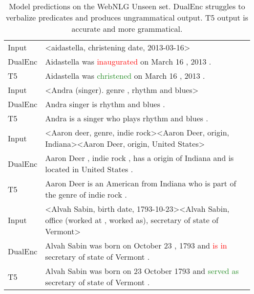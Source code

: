 \documentclass[11pt,a4paper]{article}
\begin{document}
\begin{table*}[h]
\begin{adjustbox}{width=\textwidth,center}
\begin{tabular}{|l|l|} \hline
Input & \textless{}aidastella, christening date, 2013-03-16\textgreater{}                                                                                                  \\
DualEnc & Aidastella was \textcolor{red}{inaugurated} on March 16 , 2013 .                                                                                                                    \\  
T5      & Aidastella was \textcolor{ForestGreen}{christened} on March 16 , 2013 .                                                                                                                     \\ \hline
Input  & \textless{}Andra (singer).  genre , rhythm and blues\textgreater{}                                                                                                 \\
DualEnc & Andra singer is rhythm and blues .                                                                                                                                 \\
T5      & Andra is a singer who plays rhythm and blues .                                                                                                                     \\ \hline
Input & \textless{}Aaron deer, genre, indie rock\textgreater \textless{}Aaron Deer, origin, Indiana\textgreater \textless{}Aaron Deer, origin, United States\textgreater{} \\
DualEnc & Aaron Deer , indie rock , has a origin of Indiana and is located in United States .                                                                                \\
T5      & Aaron Deer is an American from Indiana who is part of the genre of indie rock .            \\ \hline   
Input & \textless{}Alvah Sabin, birth date, 1793-10-23\textgreater \textless{}Alvah Sabin, office (worked at , worked as), secretary of state of Vermont\textgreater{}	\\
DualEnc & Alvah Sabin was born on October 23 , 1793 and \textcolor{red}{is in} secretary of state of Vermont . \\
T5 & Alvah Sabin was born on 23 October 1793 and \textcolor{ForestGreen}{served as} secretary of state of Vermont .	 \\ \hline   
\end{tabular}
\end{adjustbox}
\caption{Model predictions on the WebNLG Unseen set. DualEnc struggles to verbalize predicates and produces ungrammatical output. T5 output is accurate and more grammatical.}
\label{model-predictions}
\end{table*}
\end{document}

